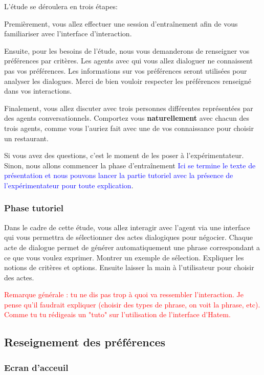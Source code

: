 \documentclass [french]{paper}
\begin{document}
			L'étude se déroulera en trois étapes:
			
			Premièrement, vous allez effectuer une session d'entraînement afin de vous familiariser avec l'interface d'interaction.
			
			Ensuite, pour les besoins de l'étude, nous vous demanderons de renseigner vos préférences par critères. Les agents avec qui vous allez dialoguer ne connaissent pas vos préférences. Les informations sur vos préférences seront utilisées pour analyser les dialogues. Merci de bien vouloir respecter les préférences renseigné dans vos interactions.
			
			Finalement, vous allez discuter avec trois personnes différentes représentées par des agents conversationnels.  Comportez vous \textbf{naturellement} avec chacun des trois agents, comme vous l'auriez fait avec une de vos connaissance pour choisir un restaurant.  
			
			
			Si vous avez des questions, c'est le moment de les poser à l'expérimentateur. Sinon, nous allons commencer la phase d'entraînement 
			\textcolor{blue}{Ici se termine le texte de présentation et nous pouvons lancer la partie tutoriel avec la présence de l'expérimentateur pour toute explication}.
			
			\subsubsection{Phase tutoriel}
			Dans le cadre de cette étude, vous allez interagir avec l'agent via une interface qui vous permettra de sélectionner des actes dialogiques pour négocier. 
			Chaque acte de dialogue permet de générer automatiquement une phrase correspondant a ce que vous voulez exprimer.
			Montrer un exemple de sélection. Expliquer les notions de critères et options. Ensuite laisser la main à l'utilisateur pour choisir des actes.  
			
			
			
			\textcolor{red}{Remarque générale : tu ne dis pas trop à quoi va ressembler l'interaction. Je pense qu'il faudrait expliquer (choisir des types de phrase, on voit la phrase, etc). Comme tu tu rédigeais un "tuto" sur l'utilisation de l'interface d'Hatem. }
			
				\subsection{Reseignement des préférences}
				\subsubsection{Ecran d'acceuil}
				
\end{document}
